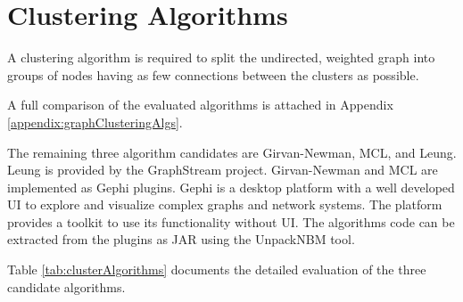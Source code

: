 \section{Clustering Algorithms}

A clustering algorithm is required to split the undirected, weighted graph into groups of nodes having as few connections between the clusters as possible. 

A full comparison of the evaluated algorithms is attached in Appendix \ref{appendix:graphClusteringAlgs}.

The remaining three algorithm candidates are Girvan-Newman, MCL, and Leung. Leung is provided by the GraphStream project. Girvan-Newman and MCL are implemented as Gephi plugins. Gephi is a desktop platform with a well developed \gls{UI} to explore and visualize complex graphs and network systems. The platform provides a toolkit to use its functionality without \gls{UI}.  The algorithms code can be extracted from the plugins as \gls{JAR} using the UnpackNBM tool\cite{unpackNBM}.

Table \ref{tab:clusterAlgorithms} documents the detailed evaluation of the three candidate algorithms. 

